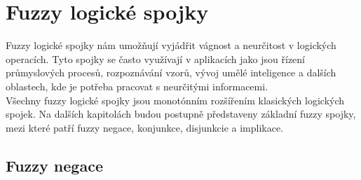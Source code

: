 \begin{graph}
{
            }
\end{graph}



\section{Fuzzy logick\'e spojky}
Fuzzy logické spojky n\'am umožňují vyjádřit vágnost a neurčitost v logických operacích. Tyto spojky se často využívají v aplikacích jako jsou řízení průmyslových procesů, rozpoznávání vzorů, vývoj umělé inteligence a dalších oblastech, kde je potřeba pracovat s neurčitými informacemi.\\

V\v sechny fuzzy logick\'e spojky jsou monot\'onn\'im roz\v s\'i\v ren\'im klasick\'ych logick\'ych spojek. Na dalších kapitolách budou postupně představeny základní fuzzy spojky, mezi kter\'e  patří 
fuzzy negace, konjunkce, disjunkcie a implikace. 

\subsection{Fuzzy negace}

